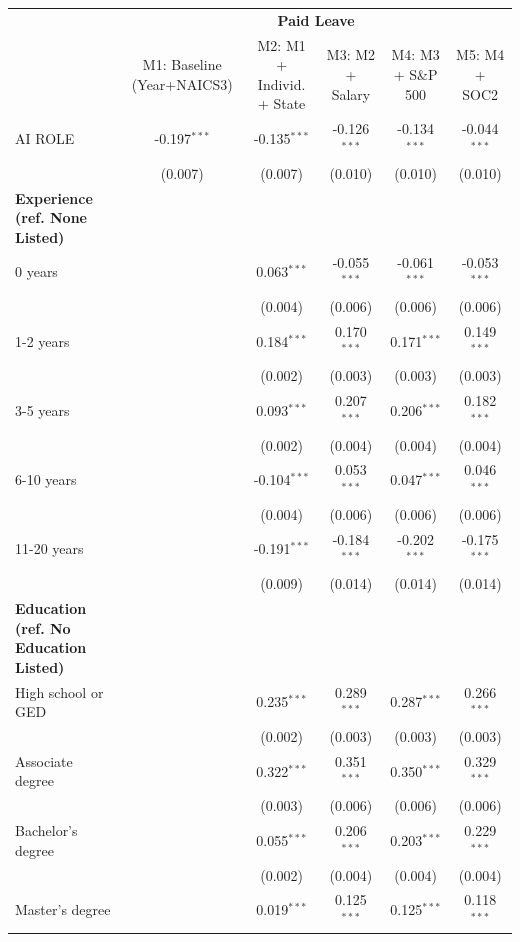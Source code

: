 \begin{table}[!htbp]
\centering
\tiny
\begin{tabular}{lccccc}
\toprule
 & \multicolumn{5}{c}{\textbf{Paid Leave}} \\
 & M1: Baseline (Year+NAICS3) & M2: M1 + Individ. + State & M3: M2 + Salary & M4: M3 + S\&P 500 & M5: M4 + SOC2 \\
\midrule
AI ROLE & -0.197$^{***}$ & -0.135$^{***}$ & -0.126$^{***}$ & -0.134$^{***}$ & -0.044$^{***}$ \\
 & (0.007) & (0.007) & (0.010) & (0.010) & (0.010) \\
\midrule
\textbf{Experience (ref. None Listed)} &  &  &  &  &  \\
0 years &  & 0.063$^{***}$ & -0.055$^{***}$ & -0.061$^{***}$ & -0.053$^{***}$ \\
 &  & (0.004) & (0.006) & (0.006) & (0.006) \\
1-2 years &  & 0.184$^{***}$ & 0.170$^{***}$ & 0.171$^{***}$ & 0.149$^{***}$ \\
 &  & (0.002) & (0.003) & (0.003) & (0.003) \\
3-5 years &  & 0.093$^{***}$ & 0.207$^{***}$ & 0.206$^{***}$ & 0.182$^{***}$ \\
 &  & (0.002) & (0.004) & (0.004) & (0.004) \\
6-10 years &  & -0.104$^{***}$ & 0.053$^{***}$ & 0.047$^{***}$ & 0.046$^{***}$ \\
 &  & (0.004) & (0.006) & (0.006) & (0.006) \\
11-20 years &  & -0.191$^{***}$ & -0.184$^{***}$ & -0.202$^{***}$ & -0.175$^{***}$ \\
 &  & (0.009) & (0.014) & (0.014) & (0.014) \\
\midrule
\textbf{Education (ref. No Education Listed)} &  &  &  &  &  \\
High school or GED &  & 0.235$^{***}$ & 0.289$^{***}$ & 0.287$^{***}$ & 0.266$^{***}$ \\
 &  & (0.002) & (0.003) & (0.003) & (0.003) \\
Associate degree &  & 0.322$^{***}$ & 0.351$^{***}$ & 0.350$^{***}$ & 0.329$^{***}$ \\
 &  & (0.003) & (0.006) & (0.006) & (0.006) \\
Bachelor's degree &  & 0.055$^{***}$ & 0.206$^{***}$ & 0.203$^{***}$ & 0.229$^{***}$ \\
 &  & (0.002) & (0.004) & (0.004) & (0.004) \\
Master's degree &  & 0.019$^{***}$ & 0.125$^{***}$ & 0.125$^{***}$ & 0.118$^{***}$ \\

\end{tabular}
\end{table}
